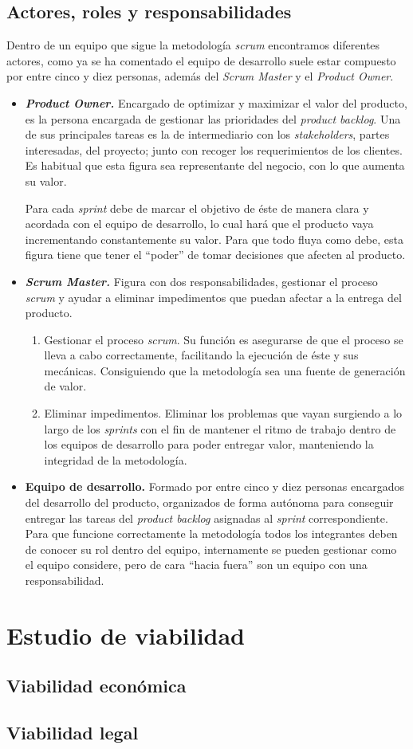 \subsection{Actores, roles y responsabilidades}
Dentro de un equipo que sigue la metodología \textit{scrum} encontramos diferentes actores, como ya se ha comentado el equipo de desarrollo suele estar compuesto por entre cinco y diez personas, además del \textit{Scrum Master} y el \textit{Product Owner}.\cite{julioroche_2020}
\begin{itemize}
\item \textbf{\textit{Product Owner.}} Encargado de optimizar y maximizar el valor del producto, es la persona encargada de gestionar las prioridades del \textit{product backlog}. Una de sus principales tareas es la de intermediario con los \textit{stakeholders}, partes interesadas, del proyecto; junto con recoger los requerimientos de los clientes. Es habitual que esta figura sea representante del negocio, con lo que aumenta su valor.

Para cada \textit{sprint} debe de marcar el objetivo de éste de manera clara y acordada con el equipo de desarrollo, lo cual hará que el producto vaya incrementando constantemente su valor. Para que todo fluya como debe, esta figura tiene que tener el ``poder'' de tomar decisiones que afecten al producto.

\item \textbf{\textit{Scrum Master.}} Figura con dos responsabilidades, gestionar el proceso \textit{scrum} y ayudar a eliminar impedimentos que puedan afectar a la entrega del producto.
\begin{enumerate}
\item Gestionar el proceso \textit{scrum}. Su función es asegurarse de que el proceso se lleva a cabo correctamente, facilitando la ejecución de éste y sus mecánicas. Consiguiendo que la metodología sea una fuente de generación de valor.
\item Eliminar impedimentos. Eliminar los problemas que vayan surgiendo a lo largo de los \textit{sprints} con el fin de mantener el ritmo de trabajo dentro de los equipos de desarrollo para poder entregar valor, manteniendo la integridad de la metodología.
\end{enumerate}
\item \textbf{Equipo de desarrollo.} Formado por entre cinco y diez personas encargados del desarrollo del producto, organizados de forma autónoma para conseguir entregar las tareas del \textit{product backlog} asignadas al \textit{sprint} correspondiente. Para que funcione correctamente la metodología todos los integrantes deben de conocer su rol dentro del equipo, internamente se pueden gestionar como el equipo considere, pero de cara ``hacia fuera'' son un equipo con una responsabilidad.
\end{itemize}
\newpage
\section{Estudio de viabilidad}

\newpage
\subsection{Viabilidad económica}

\newpage
\subsection{Viabilidad legal}

\newpage
